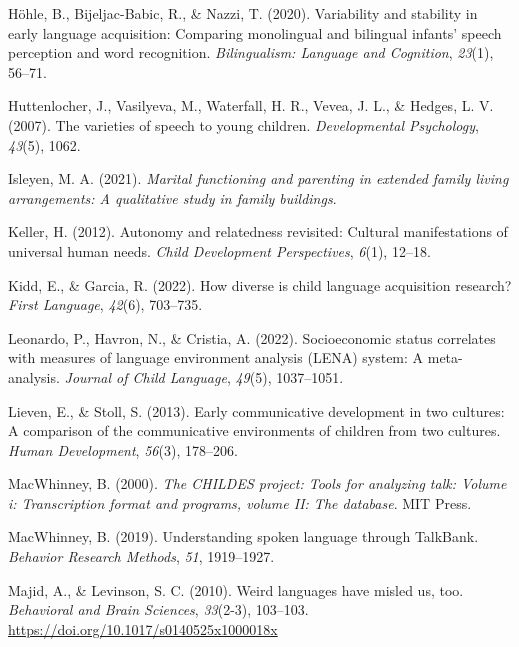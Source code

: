 \documentclass[
  man,floatsintext]{apa6}
\newlength{\cslhangindent}
\newlength{\cslentryspacingunit} %
\newenvironment{CSLReferences}[2] %
 {%
  \setlength{\parindent}{0pt}
  \ifodd #1
  \let\oldpar\par
  \def\par{\hangindent=\cslhangindent\oldpar}
  \fi
  \setlength{\parskip}{#2\cslentryspacingunit}
 }%
 {}
\begin{document}
\begin{CSLReferences}{1}{0}
\leavevmode{}%
Höhle, B., Bijeljac-Babic, R., \& Nazzi, T. (2020). Variability and stability in early language acquisition: Comparing monolingual and bilingual infants' speech perception and word recognition. \emph{Bilingualism: Language and Cognition}, \emph{23}(1), 56--71.

\leavevmode{}%
Huttenlocher, J., Vasilyeva, M., Waterfall, H. R., Vevea, J. L., \& Hedges, L. V. (2007). The varieties of speech to young children. \emph{Developmental Psychology}, \emph{43}(5), 1062.

\leavevmode{}%
Isleyen, M. A. (2021). \emph{Marital functioning and parenting in extended family living arrangements: A qualitative study in family buildings}.

\leavevmode{}%
Keller, H. (2012). Autonomy and relatedness revisited: Cultural manifestations of universal human needs. \emph{Child Development Perspectives}, \emph{6}(1), 12--18.

\leavevmode{}%
Kidd, E., \& Garcia, R. (2022). How diverse is child language acquisition research? \emph{First Language}, \emph{42}(6), 703--735.

\leavevmode{}%
Leonardo, P., Havron, N., \& Cristia, A. (2022). Socioeconomic status correlates with measures of language environment analysis (LENA) system: A meta-analysis. \emph{Journal of Child Language}, \emph{49}(5), 1037--1051.

\leavevmode{}%
Lieven, E., \& Stoll, S. (2013). Early communicative development in two cultures: A comparison of the communicative environments of children from two cultures. \emph{Human Development}, \emph{56}(3), 178--206.

\leavevmode{}%
MacWhinney, B. (2000). \emph{The CHILDES project: Tools for analyzing talk: Volume i: Transcription format and programs, volume II: The database}. MIT Press.

\leavevmode{}%
MacWhinney, B. (2019). Understanding spoken language through TalkBank. \emph{Behavior Research Methods}, \emph{51}, 1919--1927.

\leavevmode{}%
Majid, A., \& Levinson, S. C. (2010). Weird languages have misled us, too. \emph{Behavioral and Brain Sciences}, \emph{33}(2-3), 103--103. \url{https://doi.org/10.1017/s0140525x1000018x}


\end{CSLReferences}
\end{document}
